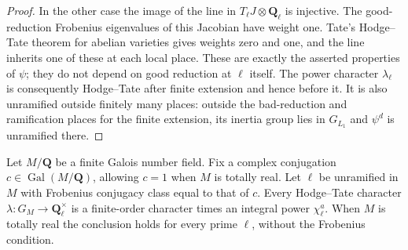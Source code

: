 \begin{proof}
In the other case the image of the line in
$T_\ell J\otimes\mathbf Q_\ell$ is injective.
The good-reduction Frobenius eigenvalues of this
Jacobian have weight one. Tate's Hodge--Tate theorem
for abelian varieties gives weights zero and one,
and the line inherits one of these at each local
place. These are exactly the asserted properties
of $\psi$; they do not depend on good reduction
at $\ell$ itself.
The power character $\lambda_\ell$ is consequently
Hodge--Tate after finite extension and hence before
it. It is also unramified outside finitely many
places: outside the bad-reduction and ramification
places for the finite extension, its inertia group
lies in $G_{L_1}$ and $\psi^d$ is unramified there.
\end{proof}

\begin{lemma}
\label{A:conjugation-prime-character}
Let $M/\mathbf Q$ be a finite Galois number field.
Fix a complex conjugation $c\in\operatorname{Gal}(M/\mathbf Q)$,
allowing $c=1$ when $M$ is totally real. Let $\ell$
be unramified in $M$ with Frobenius conjugacy class
equal to that of $c$. Every Hodge--Tate character
$\lambda:G_M\to\mathbf Q_\ell^\times$ is a finite-order
character times an integral power $\chi_\ell^a$.
When $M$ is totally real the conclusion holds for
every prime $\ell$, without the Frobenius condition.
\end{lemma}
